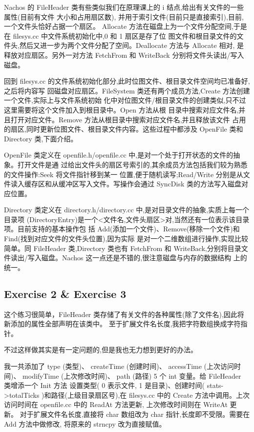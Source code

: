 \documentclass[nofonts]{ctexart}
\begin{document}
Nachos 的 FileHeader 类有些类似我们在原理课上的 i 结点,给出有关文件的一些属性(目前有文件
大小和占用扇区数), 并用于索引文件(目前只是直接索引),目前,一个文件头恰好占据一个扇区。
Allocate 方法在磁盘上为一个文件分配空间,于是在 filesys.cc 中文件系统初始化中,0 和 1 扇区是存了位
图文件和根目录文件的文件头,然后又进一步为两个文件分配了空间。Deallocate 方法与 Allocate 相对,
是释放对应扇区。另外一对方法 FetchFrom 和 WriteBack 分别将文件头读出/写入磁盘。

回到 filesys.cc 的文件系统初始化部分,此时位图文件、根目录文件空间均已准备好,之后将内容写
回磁盘对应扇区。FileSystem 类还有两个成员方法,Create 方法创建一个文件,实际上与文件系统初始
化中对位图文件/根目录文件的创建类似,只不过这里需要将这个文件加入到根目录中。Open 方法从根
目录中搜索对应文件名,并且打开对应文件。Remove 方法从根目录中搜索对应文件名,并且释放该文件
占用的扇区,同时更新位图文件、根目录文件内容。这些过程中都涉及 OpenFile 类和 Directory 类,下面介绍。

OpenFile 类定义在 openfile.h/openfile.cc 中,是对一个处于打开状态的文件的抽象。打开文件是通
过给出文件头的扇区号索引的,其余成员方法包括我们较为熟悉的文件操作:Seek 将文件指针移到某一
位置,便于随机读写;Read/Write 分别是从文件读入缓存区和从缓冲区写入文件。写操作会通过
SyncDisk 类的方法写入磁盘对应位置。

Directory 类定义在 directory.h/directory.cc 中,是对目录文件的抽象,实质上每一个目录项
(DirectoryEntry)是一个<文件名,文件头扇区>对,当然还有一位表示该目录项。目前支持的基本操作包
括 Add(添加一个文件)、Remove(移除一个文件)和 Find(找到对应文件的文件头位置),因为实际
是对一个二维数组进行操作,实现比较简单。同 FileHeader 类,Directory 类也有 FetchFrom 和
WriteBack,分别将目录文件读出/写入磁盘。Nachos 这一点还是不错的,很注意磁盘与内存的数据结构
上的统一。
\subsection*{Exercise 2 \& Exercise 3}

这个练习很简单，FileHeader 类存储了有关文件的各种属性(除了文件名),因此将新添加的属性全部声明在该类中。
至于扩展文件名长度,我把字符数组换成字符指针。

不过这样做其实是有一定问题的,但是我也无力想到更好的办法。

我一共添加了 type (类型)、 createTime (创建时间)、 accessTime (上次访问时
间)、 modifyTime (上次修改时间)、 path (路径) 5 个 int 变量。给 FileHeader 类增添一个 Init 方法
设置类型( 0 表示文件, 1 是目录)、创建时间( stats->totalTicks )和路径(上级目录扇区号),在 filesys.cc 中的 Create 方法中调用。上次访问时间在 openfile.cc 中的 ReadAt 方法更新,
上次修改时间则在 WriteAt 更新。
对于扩展文件名长度,直接将 char 数组改为 char 指针,长度即不受限。需要在 Add 方法中做修改,
将原来的 strncpy 改为直接赋值。
\end{document}
